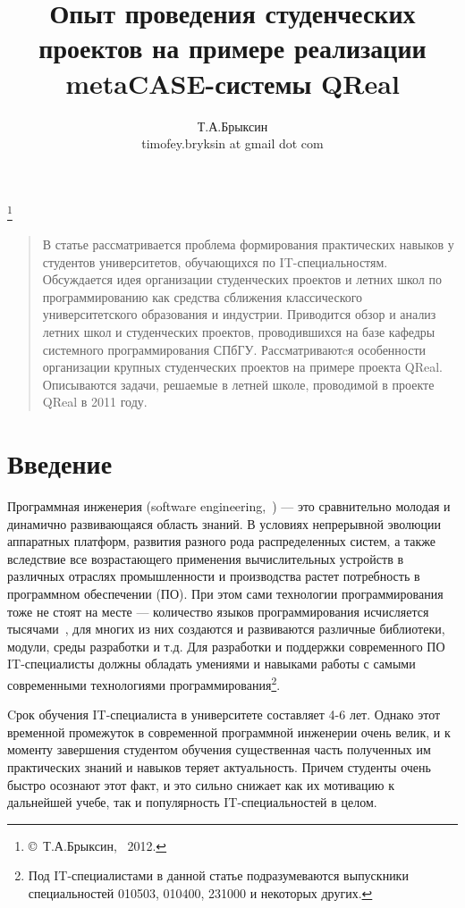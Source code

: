 \documentclass[a4paper]{article}
\title{Опыт проведения студенческих проектов на примере реализации metaCASE-системы QReal}
\author{Т.А.Брыксин \\ timofey.bryksin at gmail dot com}
\date{}
\begin{document}
\maketitle
\thispagestyle{empty}


\renewcommand{\thefootnote}{}
\footnote{\small{\copyright~Т.А.Брыксин, ~2012.}}
\renewcommand{\thefootnote}{\arabic{footnote}}
\setcounter{footnote}{0}

\begin{quote}
\small\noindent
В статье рассматривается проблема формирования практических навыков у студентов университетов, обучающихся по IT-специальностям. Обсуждается идея организации студенческих проектов и летних школ по программированию как средства сближения классического университетского образования и индустрии. Приводится обзор и анализ летних школ и студенческих проектов, проводившихся на базе кафедры системного программирования СПбГУ. Рассматриваютcя особенности организации крупных студенческих проектов на примере проекта QReal. Описываются задачи, решаемые в летней школе, проводимой в проекте QReal в 2011 году. 
\end{quote}


\section*{Введение} 
Программная инженерия (software engineering,~\cite{terekhov1, swebok}) --- это сравнительно молодая и динамично развивающаяся область знаний. В условиях непрерывной эволюции аппаратных платформ, развития разного рода распределенных систем, а также вследствие все возрастающего применения вычислительных устройств в различных отраслях промышленности и производства растет потребность в программном обеспечении (ПО).  При этом сами технологии программирования тоже не стоят на месте --- количество языков программирования исчисляется тысячами~\cite{langList}, для многих из них создаются и развиваются различные библиотеки, модули, среды разработки и т.д. Для разработки и поддержки современного ПО IT-специалисты должны обладать умениями и навыками работы с самыми современными технологиями программирования\footnote{Под IT-специалистами в данной статье подразумеваются выпускники специальностей 010503, 010400, 231000 и некоторых других.}. 
 
Cрок обучения IT-специалиста в университете составляет 4-6 лет. Однако этот временной промежуток  в современной программной инженерии очень велик, и к моменту завершения студентом обучения существенная часть полученных им практических знаний и навыков теряет актуальность. Причем студенты очень быстро осознают этот факт, и это сильно снижает как их мотивацию к дальнейшей учебе, так и популярность IT-специальностей в целом. 
\end{document}
